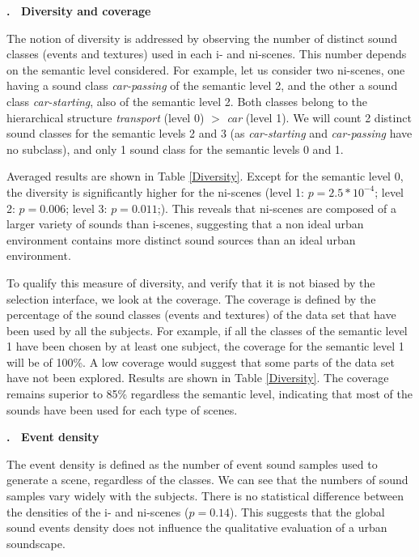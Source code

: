 \documentclass[12pt, titlepage, reqno]{article} %
\renewcommand{\subsection}[1]{\medskip \addtocounter{subsection}{1}\raggedright
    \textbf{\Alph{subsection}. \ #1} \medskip \setcounter{subsubsection}{0}\setlength{\parindent}{5ex}
}
\begin{document}
\subsection{Diversity and coverage}

The notion of diversity is addressed by observing the number of distinct sound classes (events and textures) used in each i- and ni-scenes. This number depends on the semantic level considered. For example, let us consider two ni-scenes, one having a sound class \textit{car-passing} of the semantic level 2, and the other a sound class \textit{car-starting}, also of the semantic level 2. Both classes  belong to the hierarchical structure \textit{transport} (level 0) $>$ \textit{car} (level 1). We will count 2 distinct sound classes for the semantic levels 2 and 3 (as \textit{car-starting} and \textit{car-passing} have no subclass), and only 1 sound class for the semantic levels 0 and 1. 

Averaged results  are shown in Table \ref{Diversity}. Except for the semantic level 0, the diversity is significantly higher for the ni-scenes (level 1: $p = 2.5*10^{-4}$;  level 2: $p =0.006$;  level 3: $p = 0.011$;). This reveals that ni-scenes are composed of a larger variety of sounds than i-scenes, suggesting that a non ideal urban environment contains more distinct sound sources than an ideal urban environment. 

To qualify this measure of diversity, and verify that it is not biased by the selection interface, we look at the coverage. The coverage is defined by the percentage of the sound classes (events and textures) of the data set that have been used by all the subjects. For example, if all the classes of the semantic level 1 have been chosen by at least one subject, the coverage for the semantic level 1 will be of 100\%. A low coverage would suggest that some parts of the data set have not been explored. Results are shown in Table \ref{Diversity}. The coverage remains superior to 85\% regardless the semantic level, indicating that most of the sounds have been used for each type of scenes. 





\subsection{Event density}

The event density is defined as the number of event sound samples used to generate a scene, regardless of the classes.  We can see that the numbers of sound samples vary widely with the subjects. There is no statistical difference between the densities of the i- and ni-scenes ($p=0.14$). This suggests that the global sound events density  does not influence the qualitative evaluation of a urban soundscape.
\end{document}
